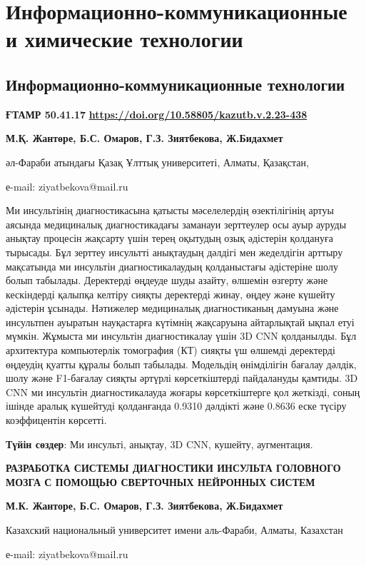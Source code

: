\let\cleardoublepage\clearpage
\part{Информационно-коммуникационные и химические технологии}
\chapter{Информационно-коммуникационные технологии}

{\bfseries ҒТАМР 50.41.17}
\hfill {\bfseries \href{https://doi.org/10.58805/kazutb.v.2.23-438}{https://doi.org/10.58805/kazutb.v.2.23-438}}


\begin{center}
{\bfseries М.Қ. Жантөре, Б.С. Омаров, Г.З. Зиятбекова\envelope, Ж.Бидахмет}

әл-Фараби атындағы Қазақ Ұлттық университеті, Алматы, Қазақстан,

е-mail: ziyatbekova@mail.ru
\end{center}

Ми инсультінің диагностикасына қатысты мәселелердің өзектілігінің артуы
аясында медициналық диагностикадағы заманауи зерттеулер осы ауыр ауруды
анықтау процесін жақсарту үшін терең оқытудың озық әдістерін қолдануға
тырысады. Бұл зерттеу инсультті анықтаудың дәлдігі мен жеделдігін
арттыру мақсатында ми инсультін диагностикалаудың қолданыстағы
әдістеріне шолу болып табылады. Деректерді өңдеуде шуды азайту, өлшемін
өзгерту және кескіндерді қалыпқа келтіру сияқты деректерді жинау, өңдеу
және күшейту әдістерін ұсынады. Нәтижелер медициналық диагностиканың
дамуына және инсультпен ауыратын науқастарға күтімнің жақсаруына
айтарлықтай ықпал етуі мүмкін. Жұмыста ми инсультін диагностикалау үшін
3D CNN қолданылды. Бұл архитектура компьютерлік томография (КТ) сияқты
үш өлшемді деректерді өңдеудің қуатты құралы болып табылады. Модельдің
өнімділігін бағалау дәлдік, шолу және F1-бағалау сияқты әртүрлі
көрсеткіштерді пайдалануды қамтиды. 3D CNN ми инсультін диагностикалауда
жоғары көрсеткіштерге қол жеткізді, соның ішінде аралық күшейтуді
қолданғанда 0.9310 дәлдікті және 0.8636 еске түсіру коэффицентін
көрсетті.

{\bfseries Түйін сөздер}: Ми инсульті, анықтау, 3D CNN, кушейту,
аугментация.

\begin{center}
{\large\bfseries РАЗРАБОТКА СИСТЕМЫ ДИАГНОСТИКИ ИНСУЛЬТА ГОЛОВНОГО МОЗГА С
ПОМОЩЬЮ СВЕРТОЧНЫХ НЕЙРОННЫХ СИСТЕМ}

{\bfseries М.К. Жанторе, Б.С. Омаров, Г.З. Зиятбекова\envelope, Ж.Бидахмет}

Казахский национальный университет имени аль-Фараби, Алматы, Казахстан

е-mail: ziyatbekova@mail.ru
\end{center}

